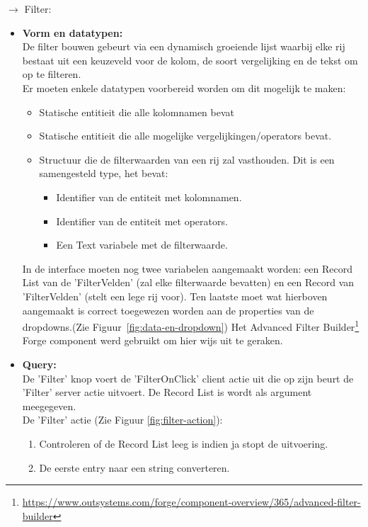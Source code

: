 $\rightarrow$ Filter:
\begin{itemize}
    \item \textbf{Vorm en datatypen:}\\
    De filter bouwen gebeurt via een dynamisch groeiende lijst waarbij elke rij bestaat uit een keuzeveld voor de kolom, de soort vergelijking en de tekst om op te filteren.\\
    Er moeten enkele datatypen voorbereid worden om dit mogelijk te maken:
    \begin{itemize}
        \item Statische entitieit die alle kolomnamen bevat
        \item Statische entitieit die alle mogelijke vergelijkingen/operators bevat.
        \item Structuur die de filterwaarden van een rij zal vasthouden. Dit is een samengesteld type, het bevat:
        \begin{itemize}
            \item Identifier van de entiteit met kolomnamen.
            \item Identifier van de entiteit met operators.
            \item Een Text variabele met de filterwaarde.
        \end{itemize}
    \end{itemize}
    In de interface moeten nog twee variabelen aangemaakt worden: een Record List van de 'FilterVelden' (zal elke filterwaarde bevatten) en een Record van 'FilterVelden' (stelt een lege rij voor). Ten laatste moet wat hierboven aangemaakt is correct toegewezen worden aan de properties van de dropdowns.(Zie Figuur~\ref{fig:data-en-dropdown})
    Het Advanced Filter Builder\footnote{\url{https://www.outsystems.com/forge/component-overview/365/advanced-filter-builder}} Forge component werd gebruikt om hier wijs uit te geraken.\\
    \item \textbf{Query:}\\
    De 'Filter' knop voert de 'FilterOnClick' client actie uit die op zijn beurt de 'Filter' server actie uitvoert. De Record List is wordt als argument meegegeven.\\
    De 'Filter' actie (Zie Figuur \ref{fig:filter-action}):
    \begin{enumerate}
        \item Controleren of de Record List leeg is indien ja stopt de uitvoering.
        \item De eerste entry naar een string converteren. 

\end{enumerate}
\end{itemize}
